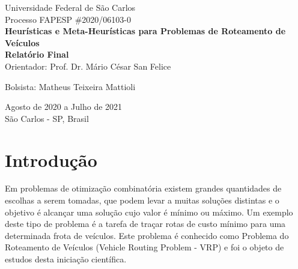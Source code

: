 \documentclass[12pt, a4paper]{article}
\begin{document}
\begin{titlepage}
	\begin{center}
    	\large{Universidade Federal de São Carlos}\\
    	\vspace{65pt}
    	\vspace{35pt}
    	\large{Processo FAPESP \#2020/06103-0}\\ 
        \vspace{95pt}
        \textbf{\LARGE{Heurísticas e Meta-Heurísticas para Problemas de Roteamento de Veículos}}\\
        \vspace{0,5cm}
        \textbf{Relatório Final}\\
        \vspace{2,5cm}
        Orientador: Prof. Dr. Mário César San Felice
            
        Bolsista: Matheus Teixeira Mattioli
    	\vspace{2,5cm}
	\end{center}
	
	\begin{flushleft}
		\begin{tabbing}
			
	\end{tabbing}
 \end{flushleft}
	\vspace{1cm}
	
	\begin{center}
		\vspace{\fill}
		 Agosto de 2020 a Julho de 2021\\
		 São Carlos - SP, Brasil
			\end{center}
\end{titlepage}

\newpage
\tableofcontents
\thispagestyle{empty}
\newpage



\section{Introdução} \label{sec:introduction}
Em problemas de otimização combinatória existem grandes quantidades de escolhas a serem tomadas, que podem levar a muitas soluções distintas e o objetivo é alcançar uma solução cujo valor é mínimo ou máximo. Um exemplo deste tipo de problema é a tarefa de traçar rotas de custo mínimo para uma determinada frota de veículos. Este problema é conhecido como Problema do Roteamento de Veículos (Vehicle Routing Problem - VRP) e foi o objeto de estudos desta iniciação científica.
\end{document}
